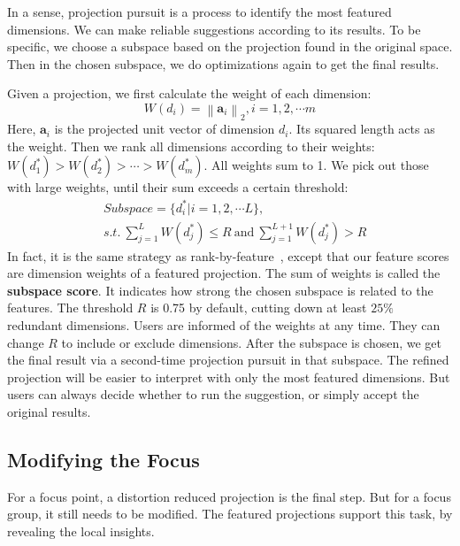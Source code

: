 In a sense, projection pursuit is a process to identify the most featured dimensions. We can make reliable suggestions according to its results. To be specific, we choose a subspace based on the projection found in the original space. Then in the chosen subspace, we do optimizations again to get the final results.

Given a projection, we first calculate the weight of each dimension:
\begin{equation}
W(d_{i}) = \left \|  \mathbf{a}_{i}\right \|_{2}, i = 1,2,\cdots m
\end{equation}
Here, $\mathbf{a}_{i}$ is the projected unit vector of dimension $d_{i}$. Its squared length acts as the weight. Then we rank all dimensions according to their weights: $W(d_{1}^{*}) > W(d_{2}^{*}) > \cdots >W(d_{m}^{*})$. All weights sum to 1. We pick out those with large weights, until their sum exceeds a certain threshold:
\begin{equation}
\begin{split}
&Subspace = \{d_{i}^{*}| i = 1,2, \cdots L \},\\
&s.t.\ \sum\limits_{j=1}^{L} W(d_{j}^{*}) \leq R \ \text{and}\ \sum\limits_{j=1}^{L+1} W(d_{j}^{*}) > R
\end{split}
\end{equation}
In fact, it is the same strategy as rank-by-feature~\cite{DBLP:journals/ivs/SeoS05}, except that our feature scores are dimension weights of a featured projection. The sum of weights is called the \textbf{subspace score}. It indicates how strong the chosen subspace is related to the features. The threshold $R$ is 0.75 by default, cutting down at least $25\%$ redundant dimensions. Users are informed of the weights at any time. They can change $R$ to include or exclude dimensions. After the subspace is chosen, we get the final result via a second-time projection pursuit in that subspace. The refined projection will be easier to interpret with only the most featured dimensions. But users can always decide whether to run the suggestion, or simply accept the original results.


\subsection{Modifying the Focus}
For a focus point, a distortion reduced projection is the final step. But for a focus group, it still needs to be modified. The featured projections support this task, by revealing the local insights.

